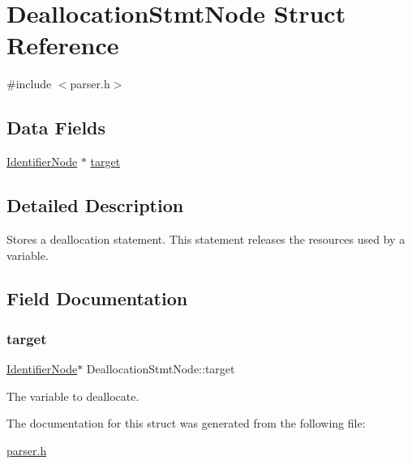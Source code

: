 \hypertarget{struct_deallocation_stmt_node}{}\section{Deallocation\+Stmt\+Node Struct Reference}
\label{struct_deallocation_stmt_node}


{\ttfamily \#include $<$parser.\+h$>$}

\subsection*{Data Fields}
\begin{DoxyCompactItemize}
\item 
\hyperlink{parser_8h_a930727769b8a8eb0d24d474f3aa12a43}{Identifier\+Node} $\ast$ \hyperlink{struct_deallocation_stmt_node_a0658a9d646e7cbdf8304b8e67900dc78}{target}
\end{DoxyCompactItemize}


\subsection{Detailed Description}
Stores a deallocation statement. This statement releases the resources used by a variable. 

\subsection{Field Documentation}
\mbox{\label{struct_deallocation_stmt_node_a0658a9d646e7cbdf8304b8e67900dc78}} 
\subsubsection{\texorpdfstring{target}{target}}
{\footnotesize\ttfamily \hyperlink{parser_8h_a930727769b8a8eb0d24d474f3aa12a43}{Identifier\+Node}$\ast$ Deallocation\+Stmt\+Node\+::target}

The variable to deallocate. 

The documentation for this struct was generated from the following file\+:\begin{DoxyCompactItemize}
\item 
\hyperlink{parser_8h}{parser.\+h}\end{DoxyCompactItemize}
